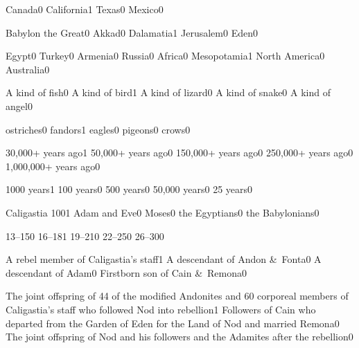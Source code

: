 {Canada}{0}
{California}{1}
{Texas}{0}
{Mexico}{0}
\qstop



{Babylon the Great}{0}
{Akkad}{0}
{Dalamatia}{1}
{Jerusalem}{0}
{Eden}{0}
\qstop

{Egypt}{0}
{Turkey}{0}
{Armenia}{0}
{Russia}{0}
{Africa}{0}
{Mesopotamia}{1}
{North America}{0}
{Australia}{0}
\qstop

{A kind of fish}{0}
{A kind of bird}{1}
{A kind of lizard}{0}
{A kind of snake}{0}
{A kind of angel}{0}
\qstop

{ostriches}{0}
{fandors}{1}
{eagles}{0}
{pigeons}{0}
{crows}{0}
\qstop

{30,000+ years ago}{1}
{50,000+ years ago}{0}
{150,000+ years ago}{0}
{250,000+ years ago}{0}
{1,000,000+ years ago}{0}
\qstop

{1000 years}{1}
{100 years}{0}
{500 years}{0}
{50,000 years}{0}
{25 years}{0}
\qstop

{Caligastia 100}{1}
{Adam and Eve}{0}
{Moses}{0}
{the Egyptians}{0}
{the Babylonians}{0}
\qstop

{13--15}{0}
{16--18}{1}
{19--21}{0}
{22--25}{0}
{26--30}{0}
\qstop


{A rebel member of Caligastia's staff}{1}
{A descendant of Andon \&\ Fonta}{0}
{A descendant of Adam}{0}
{Firstborn son of Cain \&\ Remona}{0}
\qstop

{The joint offspring of 44 of the modified Andonites and 60 corporeal members of Caligastia's staff who followed Nod into rebellion}{1}
{Followers of Cain who departed from the Garden of Eden for the Land of Nod and married Remona}{0}
{The joint offspring of Nod and his followers and the Adamites after the rebellion}{0}
\qstop

